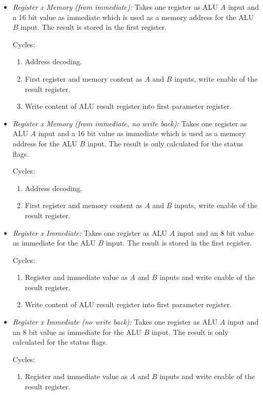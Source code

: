 \begin{itemize}
  \item \emph{Register x Memory (from immediate):} Takes one register as \gls{ALU} $A$ input and a 16 bit value as immediate which is used as a memory address for the \gls{ALU} $B$ input.
  The result is stored in the first register.

  Cycles:
  \begin{enumerate}
    \item Address decoding.
    \item First register and memory content as $A$ and $B$ inputs, write enable of the result register.
    \item Write content of \gls{ALU} result register into first parameter register.
  \end{enumerate}

  \item \emph{Register x Memory (from immediate, no write back):} Takes one register as \gls{ALU} $A$ input and a 16 bit value as immediate which is used as a memory address for the \gls{ALU} $B$ input.
  The result is only calculated for the status flags.

  Cycles:
  \begin{enumerate}
    \item Address decoding.
    \item First register and memory content as $A$ and $B$ inputs, write enable of the result register.
  \end{enumerate}

  \item \emph{Register x Immediate:} Takes one register as \gls{ALU} $A$ input and an 8 bit value as immediate  for the \gls{ALU} $B$ input.
  The result is stored in the first register.

  Cycles:
  \begin{enumerate}
    \item Register and immediate value as $A$ and $B$ inputs and write enable of the result register.
    \item Write content of \gls{ALU} result register into first parameter register.
  \end{enumerate}

  \item \emph{Register x Immediate (no write back):} Takes one register as \gls{ALU} $A$ input and an 8 bit value as immediate  for the \gls{ALU} $B$ input.
  The result is only calculated for the status flags.

  Cycles:
  \begin{enumerate}
    \item Register and immediate value as $A$ and $B$ inputs and write enable of the result register.
  \end{enumerate}
\end{itemize}

